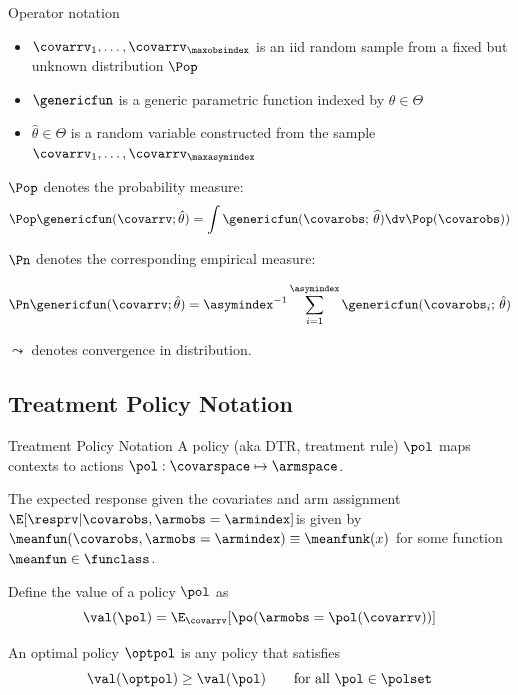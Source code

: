 \documentclass[aspectratio=169, professionalfonts]{beamer}
\begin{document}
\begin{frame}{Operator notation}
	\begin{itemize}
		\item $\covarrv_1, \ldots, \covarrv_{\maxobsindex}$ is an iid random sample from a
		      fixed but unknown distribution $\Pop$
		\item $\genericfun$ is a generic parametric function indexed by $\theta \in \Theta$
		\item $\hat{\theta} \in \Theta$ is a random variable constructed from the sample
		      $\covarrv_1, \ldots, \covarrv_{\maxasymindex}$
	\end{itemize}
	\vfill \pause

	$\Pop$ denotes the probability measure:
	\begin{equation*}
		\Pop \genericfun(\covarrv; \hat{\theta}) = \int \genericfun(\covarobs;\,\widehat{\theta}) \dv
		\Pop(\covarobs))
	\end{equation*}

	\vfill \pause $\Pn$ denotes the corresponding empirical measure:

	\begin{equation*}
		\Pn \genericfun(\covarrv; \hat{\theta}) = \asymindex^{-1}\sum_{i =
			1}^{\asymindex} \genericfun(\covarobs_{i};\,\hat{\theta})
	\end{equation*}
	\vfill \pause

	$\leadsto$ denotes convergence in distribution.

	\vfill
\end{frame}

\subsection{Treatment Policy Notation}

\begin{frame}{Treatment Policy Notation}
	A policy (aka DTR, treatment rule) $\pol$ maps contexts to actions $\pol: \covarspace \mapsto \armspace$.

	\vfill \pause
	The expected response given
	the covariates and arm assignment $\E[\resprv \vert \covarobs, \armobs =
			\armindex]$is given by $\meanfun(\covarobs, \armobs = \armindex) \equiv \meanfunk(x)$
	for some function $\meanfun \in \funclass$.

	\vfill \pause
	Define the value of a policy $\pol$ as
	\begin{equation}
		\val(\pol) = \E_{\covarrv}[\po(\armobs = \pol(\covarrv))]
	\end{equation}

	\vfill \pause
	An optimal policy $\optpol$ is any policy that satisfies
	\begin{equation}
		\val(\optpol) \geq \val(\pol) \qquad \text{for all }\pol \in \polset
	\end{equation}
\end{frame}
\end{document}
